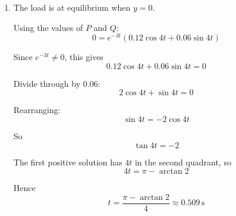 \documentclass[leqno]{article}
\begin{document}
\begin{enumerate}[
  label=\textbf{\arabic*.},
  leftmargin=*,
  topsep=0pt,
  partopsep=0pt,
  parsep=0pt
]
\begin{djsSolution}
\begin{enumerate}[label=\textbf{(\alph*)}]
\begin{enumerate}[label=(\roman*)]
    Hence
    \[
    P=0.12
    \]

    The load is moving \emph{upwards} with speed $0.12\,\mathrm{m\,s^{-1}}$, and downward is positive, so when $t=0$, $\frac{\mathrm{d}y}{\mathrm{d}t}=-0.12$.

    Differentiate
    \[
    y=e^{-3t}(P\cos 4t+Q\sin 4t)
    \]

    Using the product rule:
    \begin{align*}
    \frac{\mathrm{d}y}{\mathrm{d}t}
    &=(-3e^{-3t})(P\cos 4t+Q\sin 4t)+e^{-3t}(-4P\sin 4t+4Q\cos 4t) \\
    &=e^{-3t}\left(-3P\cos 4t-3Q\sin 4t-4P\sin 4t+4Q\cos 4t\right)
    \end{align*}

    When $t=0$:
    \begin{align*}
    \frac{\mathrm{d}y}{\mathrm{d}t}
    &=1\left(-3P\cos 0-3Q\sin 0-4P\sin 0+4Q\cos 0\right) \\
    &=-3P+4Q
    \end{align*}

    So
    \[
    -0.12=-3P+4Q
    \]

    Using $P=0.12$:
    \begin{align*}
    -0.12&=-3(0.12)+4Q \\
    -0.12&=-0.36+4Q \\
    4Q&=0.24 \\
    Q&=0.06
    \end{align*}

    Therefore
    \[
    P=0.12,\qquad Q=0.06
    \]

    \item The load is at equilibrium when $y=0$.

    Using the values of $P$ and $Q$:
    \[
    0=e^{-3t}(0.12\cos 4t+0.06\sin 4t)
    \]

    Since $e^{-3t}\neq 0$, this gives
    \[
    0.12\cos 4t+0.06\sin 4t=0
    \]

    Divide through by $0.06$:
    \[
    2\cos 4t+\sin 4t=0
    \]

    Rearranging:
    \[
    \sin 4t=-2\cos 4t
    \]

    So
    \[
    \tan 4t=-2
    \]

    The first positive solution has $4t$ in the second quadrant, so
    \[
    4t=\pi-\arctan 2
    \]

    Hence
    \[
    t=\frac{\pi-\arctan 2}{4}\approx 0.509\,\mathrm{s}
    \]
  \end{enumerate}


\end{enumerate}
\end{djsSolution}
\end{enumerate}
\end{document}

